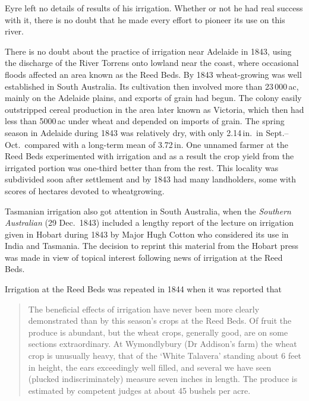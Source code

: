 Eyre left no details of results of his irrigation.  Whether or not he
had real success with it, there is no doubt that he made every effort
to pioneer its use on this river.

There is no doubt about the practice of irrigation near Adelaide in
1843, using the discharge of the River Torrens onto lowland near the
coast, where occasional floods affected an area known as the Reed
Beds.  By 1843 wheat-growing was well established in South Australia.
Its cultivation then involved more than 23\,000\,ac, mainly on the
Adelaide plains, and exports of grain had begun.  The colony easily
outstripped cereal production in the area later known as Victoria,
which then had less than 5000\,ac under wheat and depended on imports
of grain.  The spring season in Adelaide during 1843 was relatively
dry, with only 2.14\,in.\ in Sept.--Oct.\ compared with a long-term
mean of 3.72\,in.  One unnamed farmer at the Reed Beds experimented
with irrigation and as a result the crop yield from the irrigated
portion was one-third better than from the rest.  This locality was
subdivided soon after settlement and by 1843 had many landholders,
some with scores of hectares devoted to
wheatgrowing.

Tasmanian irrigation also got attention in South Australia, when the
\textsl{Southern Australian} (29 Dec.\ 1843) included a lengthy report of
the lecture on irrigation given in Hobart during 1843 by Major Hugh
Cotton who considered its use in India and Tasmania.  The decision to
reprint this material from the Hobart press was made in view of
topical interest following news of irrigation at the Reed Beds.

Irrigation at the Reed Beds was repeated in 1844 when it was reported
that
\begin{quote}
	The beneficial effects of irrigation have never been more
	clearly demonstrated than by this season's crops at the Reed
	Beds.  Of fruit the produce is abundant, but the wheat crops,
	generally good, are on some sections extraordinary. At
	Wymondlybury (Dr Addison's farm) the wheat crop is unusually
	heavy, that of the `White Talavera' standing about 6 feet in
	height, the ears exceedingly well filled, and several we have
	seen (plucked indiscriminately) measure seven inches in
	length.  The produce is estimated by competent judges at about
	45 bushels per acre.
\end{quote}

